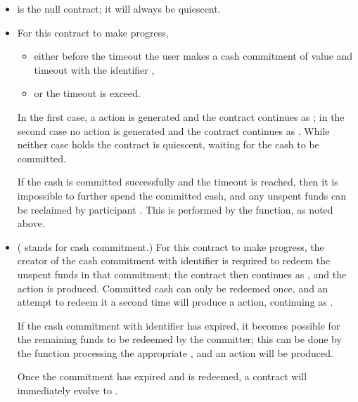 \documentclass[
      acmsmall
    , screen
    , review=true
  ]{acmart}
\begin{document}
\begin{itemize} 

\item {} is the null contract; it will always be quiescent.

\item {}  For this contract to make progress,\begin{itemize}
\item either before the timeout  the user  makes a cash commitment of value 
 and timeout   with the identifier , 
\item
or the timeout  is exceed.
\end{itemize} 
In the first case, a  action is generated and the contract continues as 
; in the second case no action is generated and the contract continues as 
. While neither case holds the contract is quiescent, waiting for the cash to be committed. 

If the cash is committed successfully and the timeout  is reached, then it is impossible to further spend the committed cash, and any unspent funds can be reclaimed by participant .
 This is performed by the  function, as noted above.

\item {} ( stands for cash commitment.) For this contract to make progress, the creator of the cash commitment with identifier  is required to redeem the unspent funds in that commitment; the contract then continues as , and the action  is produced. 
Committed cash can only be redeemed once, and an attempt to redeem it a second time will produce a   action, continuing as .

If the cash commitment with identifier  has expired, it becomes possible for the remaining funds to be redeemed by the committer; this can be done by the  function processing the appropriate , and an  action will be produced. 

Once the commitment  has expired and is redeemed, a  contract will immediately evolve to .


\end{itemize}
\end{document}
